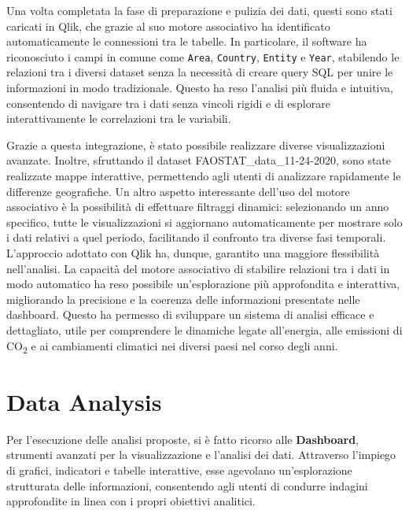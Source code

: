 Una volta completata la fase di preparazione e pulizia dei dati, questi sono stati caricati in Qlik, che grazie al suo motore associativo ha identificato automaticamente le connessioni tra le tabelle. In particolare, il software ha riconosciuto i campi in comune come \texttt{Area}, \texttt{Country}, \texttt{Entity} e \texttt{Year}, stabilendo le relazioni tra i diversi dataset senza la necessità di creare query SQL per unire le informazioni in modo tradizionale. Questo ha reso l’analisi più fluida e intuitiva, consentendo di navigare tra i dati senza vincoli rigidi e di esplorare interattivamente le correlazioni tra le variabili.

Grazie a questa integrazione, è stato possibile realizzare diverse visualizzazioni avanzate. Inoltre, sfruttando il dataset FAOSTAT\_data\_11-24-2020, sono state realizzate mappe interattive, permettendo agli utenti di analizzare rapidamente le differenze geografiche. Un altro aspetto interessante dell’uso del motore associativo è la possibilità di effettuare filtraggi dinamici: selezionando un anno specifico, tutte le visualizzazioni si aggiornano automaticamente per mostrare solo i dati relativi a quel periodo, facilitando il confronto tra diverse fasi temporali. L’approccio adottato con Qlik ha, dunque, garantito una maggiore flessibilità nell’analisi. La capacità del motore associativo di stabilire relazioni tra i dati in modo automatico ha reso possibile un’esplorazione più approfondita e interattiva, migliorando la precisione e la coerenza delle informazioni presentate nelle dashboard. Questo ha permesso di sviluppare un sistema di analisi efficace e dettagliato, utile per comprendere le dinamiche legate all’energia, alle emissioni di CO\textsubscript{2} e ai cambiamenti climatici nei diversi paesi nel corso degli anni.

\section{Data Analysis}
Per l'esecuzione delle analisi proposte, si è fatto ricorso alle \textbf{Dashboard}, strumenti avanzati per la visualizzazione e l'analisi dei dati. Attraverso l'impiego di grafici, indicatori e tabelle interattive, esse agevolano un'esplorazione strutturata delle informazioni, consentendo agli utenti di condurre indagini approfondite in linea con i propri obiettivi analitici.

